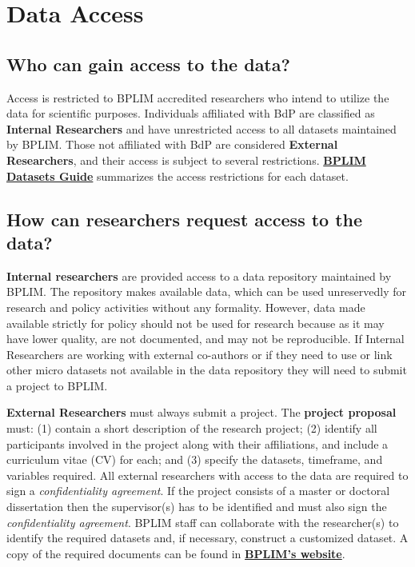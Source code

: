 \documentclass[
  a4paper,
  DIV=11,
  numbers=noendperiod]{scrartcl}
\begin{document}
\hypertarget{data-access}{%
\section{Data Access}\label{data-access}}

\hypertarget{who-can-gain-access-to-the-data}{%
\subsection{Who can gain access to the
data?}\label{who-can-gain-access-to-the-data}}

Access is restricted to BPLIM accredited researchers who intend to
utilize the data for scientific purposes. Individuals affiliated with
BdP are classified as \textbf{Internal Researchers} and have
unrestricted access to all datasets maintained by BPLIM. Those not
affiliated with BdP are considered \textbf{External Researchers}, and
their access is subject to several restrictions.
\href{https://github.com/BPLIM/Manuals/tree/master/Guides/02_BPLIM_Datasets_Guide}{\textbf{BPLIM
Datasets Guide}} summarizes the access restrictions for each dataset.

\hypertarget{how-can-researchers-request-access-to-the-data}{%
\subsection{How can researchers request access to the
data?}\label{how-can-researchers-request-access-to-the-data}}

\textbf{Internal researchers} are provided access to a data repository
maintained by BPLIM. The repository makes available data, which can be
used unreservedly for research and policy activities without any
formality. However, data made available strictly for policy should not
be used for research because as it may have lower quality, are not
documented, and may not be reproducible. If Internal Researchers are
working with external co-authors or if they need to use or link other
micro datasets not available in the data repository they will need to
submit a project to BPLIM.

\textbf{External Researchers} must always submit a project. The
\textbf{project proposal} must: (1) contain a short description of the
research project; (2) identify all participants involved in the project
along with their affiliations, and include a curriculum vitae (CV) for
each; and (3) specify the datasets, timeframe, and variables required.
All external researchers with access to the data are required to sign a
\emph{confidentiality agreement}. If the project consists of a master or
doctoral dissertation then the supervisor(s) has to be identified and
must also sign the \emph{confidentiality agreement}. BPLIM staff can
collaborate with the researcher(s) to identify the required datasets
and, if necessary, construct a customized dataset. A copy of the
required documents can be found in
\href{https://msites-dee-bplim-prd.azurewebsites.net/content/access-0}{\textbf{BPLIM's
website}}.
\end{document}
